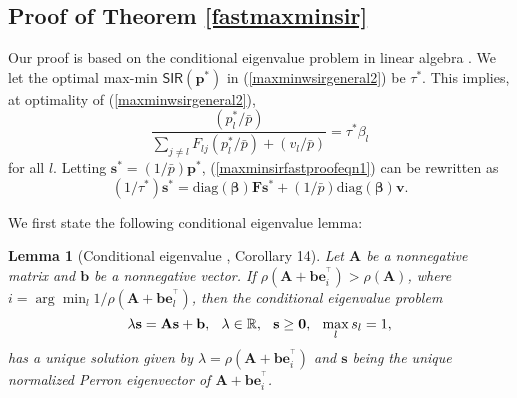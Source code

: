 \documentclass[10pt,twocolumn]{IEEEtran}
\newcommand{\0}{\mathbf{0}}
\newcommand{\1}{\mathbf{1}}
\newcommand{\trans}{^\top}
\newtheorem{lemma}{Lemma}
\begin{document}
%
%
%
\subsection{Proof of Theorem \ref{fastmaxminsir}}
Our proof is based on the conditional eigenvalue problem in linear algebra \cite{Blondel05}. We let the optimal max-min $\mathsf{SIR}(\mathbf{p}^{\ast})$ in (\ref{maxminwsirgeneral2}) be $\tau^{\ast}$. This implies, at optimality of (\ref{maxminwsirgeneral2}),
\begin{equation}
\label{maxminsirfastproofeqn1}
\frac{(p^{\ast}_l/\bar{p})}{\sum_{j \ne l} F_{lj} (p^{\ast}_l/\bar{p}) + (v_l/\bar{p})} = \tau^{\ast} \beta_l 
\end{equation}
for all $l$.
Letting $\mathbf{s}^{\ast}=(1/\bar{p})\mathbf{p}^{\ast}$, (\ref{maxminsirfastproofeqn1}) can be rewritten as
\begin{equation}
\label{maxminsirfastproofeqn2}
(1/\tau^{\ast}) \mathbf{s}^{\ast} = \mbox{diag}(\boldsymbol{\beta})\mathbf{F}\mathbf{s}^{\ast} + (1/\bar{p})\mbox{diag}(\boldsymbol{\beta}) \mathbf{v}.
\end{equation}

We first state the following conditional eigenvalue lemma:
\begin{lemma}[Conditional eigenvalue \cite{Blondel05}, Corollary 14]
\label{condeigen1}
Let $\mathbf{A}$ be a nonnegative matrix and $\mathbf{b}$ be a nonnegative vector. If $\rho(\mathbf{A}+\mathbf{b}\mathbf{e}_i^{\trans})>\rho(\mathbf{A})$, where $i=\arg \min_l 1/\rho(\mathbf{A}+\mathbf{b}\mathbf{e}_l^{\trans})$, then the conditional eigenvalue problem
$$
\lambda \mathbf{s} = \mathbf{A}\mathbf{s} + \mathbf{b}, \hspace{.1in} \lambda \in \mathbb{R}, \hspace{.1in} \mathbf{s}\ge \mathbf{0}, \hspace{.1in} \max_l s_l=1,
$$
has a unique solution given by $\lambda=\rho(\mathbf{A}+\mathbf{b}\mathbf{e}_i^{\trans})$ and $\mathbf{s}$ being the unique normalized Perron eigenvector of $\mathbf{A}+\mathbf{b}\mathbf{e}_i^{\trans}$. 
\end{lemma}
\end{document}
